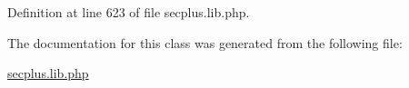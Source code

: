 Definition at line 623 of file secplus.lib.php.



The documentation for this class was generated from the following file:\begin{DoxyCompactItemize}
\item 
\hyperlink{secplus_8lib_8php}{secplus.lib.php}\end{DoxyCompactItemize}
